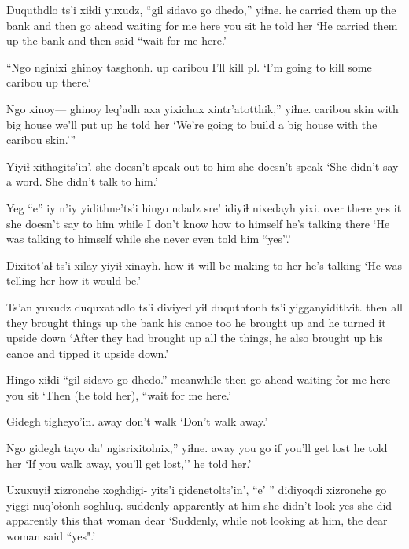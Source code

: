 \documentclass[12pt]{article}
\begin{document}
\gll Duquthdlo              ts'i xiɬdi yuxudz, ``gil      sidavo         go   dhedo,''   yiɬne.
{he carried them up the bank} and  then   {}   {go ahead} {waiting for me} here {you sit} {he told her}
\glt `He carried them up the bank and then said ``wait for me here.'
\glend

\gll ``Ngo nginixi ghinoy  tasghonh. 
{}  up      caribou {I'll kill pl.}
\glt `I'm going to kill some caribou up there.'
\glend

\gll Ngo xinoy--- ghinoy leq'adh axa  yixichux  xintr'atotthik,'' yiɬne.
{} {}  caribou  skin    with {big house} {we'll put up}  {he told her}
\glt `We're going to build a big house with the caribou skin.'''
\glend

      Yiyiɬ  {xithagits'in'.}
{she doesn't speak out} {to him} {she doesn't speak}
\glt `She didn't say a word. She didn't talk to him.'
\glend

\gll Yeg        ``e''   iy n'iy {yidithne'ts'i}  hingo  {ndadz sre'}   idiyiɬ nixedayh         yixi.
{over there} yes it {}  {she doesn't say to him}      while  {I don't know how} {to himself} {he's talking} there
\glt `He was talking to himself while she never even told him ``yes''.' 
\glend

\gll Dixitot'aɬ ts'i xilay  yiyiɬ xinayh.
{how it will be} {} making {to her} {he's talking }
\glt `He was telling her how it would be.'
\glend

\gll Ts'an yuxudz duquxathdlo ts'i diviyed yiɬ duquthtonh    ts'i yigganyiditlvit.
then  all    {they brought things up the bank} {} {his canoe} too {he brought up} and  {he turned it upside down}
\glt `After they had brought up all the things, he also brought up his canoe and tipped it upside down.'
\glend

\gll Hingo     xiɬdi ``gil      sidavo         go   dhedo.''   
meanwhile then  {go ahead} {waiting for me} here {you sit} 
\glt `Then (he told her), ``wait for me here.'
\glend

\gll Gidegh tigheyo'in. 
away   {don't walk}
\glt `Don't walk away.'
\glend

\gll Ngo gidegh tayo   da' ngisrixitolnix,''  yiɬne.
{}  away   {you go} if  {you'll get lost} {he told her}
\glt `If you walk away, you'll get lost,'' he told her.'
\glend

\gll Uxuxuyiɬ xizronche xoghdigi- yits'i {gidenetolts'in'}, {``e' ''}  didiyoqdi xizronche go   yiggi nuq'oɬonh soghluq.
suddenly  apparently {}              {at him} {she didn't look } yes {she did}  apparently        this that  woman     dear
\glt `Suddenly, while not looking at him, the dear woman said ``yes".'
\glend
\end{document}

